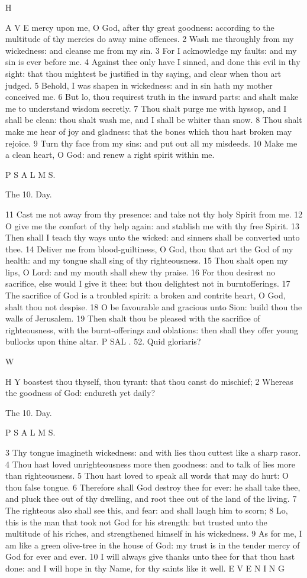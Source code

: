 H

A V E mercy upon me, O God, after thy great goodness: according to the multitude of thy mercies do away mine offences. 2 Wash me throughly from my wickedness: and cleanse me from my sin. 3 For I acknowledge my faults: and my sin is ever before me. 4 Against thee only have I sinned, and done this evil in thy sight: that thou mightest be justified in thy saying, and clear when thou art judged. 5 Behold, I was shapen in wickedness: and in sin hath my mother conceived me. 6 But lo, thou requirest truth in the inward parts: and shalt make me to understand wisdom secretly. 7 Thou shalt purge me with hyssop, and I shall be clean: thou shalt wash me, and I shall be whiter than snow. 8 Thou shalt make me hear of joy and gladness: that the bones which thou hast broken may rejoice. 9 Turn thy face from my sins: and put out all my misdeeds. 10 Make me a clean heart, O God: and renew a right spirit within me.

P S A L M S.

The 10. Day.

11 Cast me not away from thy presence: and take not thy holy Spirit from me. 12 O give me the comfort of thy help again: and stablish me with thy free Spirit. 13 Then shall I teach thy ways unto the wicked: and sinners shall be converted unto thee. 14 Deliver me from blood-guiltiness, O God, thou that art the God of my health: and my tongue shall sing of thy righteousness. 15 Thou shalt open my lips, O Lord: and my mouth shall shew thy praise. 16 For thou desirest no sacrifice, else would I give it thee: but thou delightest not in burntofferings. 17 The sacrifice of God is a troubled spirit: a broken and contrite heart, O God, shalt thou not despise. 18 O be favourable and gracious unto Sion: build thou the walls of Jerusalem. 19 Then shalt thou be pleased with the sacrifice of righteousness, with the burnt-offerings and oblations: then shall they offer young bullocks upon thine altar. P SAL . 52. Quid gloriaris?

W

H Y boastest thou thyself, thou tyrant: that thou canst do mischief; 2 Whereas the goodness of God: endureth yet daily?

The 10. Day.

P S A L M S.

3 Thy tongue imagineth wickedness: and with lies thou cuttest like a sharp rasor. 4 Thou hast loved unrighteousness more then goodness: and to talk of lies more than righteousness. 5 Thou hast loved to speak all words that may do hurt: O thou false tongue. 6 Therefore shall God destroy thee for ever: he shall take thee, and pluck thee out of thy dwelling, and root thee out of the land of the living. 7 The righteous also shall see this, and fear: and shall laugh him to scorn; 8 Lo, this is the man that took not God for his strength: but trusted unto the multitude of his riches, and strengthened himself in his wickedness. 9 As for me, I am like a green olive-tree in the house of God: my trust is in the tender mercy of God for ever and ever. 10 I will always give thanks unto thee for that thou hast done: and I will hope in thy Name, for thy saints like it well. E V E N I N G

